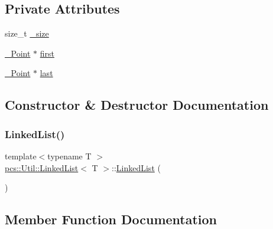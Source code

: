 \subsection*{Private Attributes}
\begin{DoxyCompactItemize}
\item 
size\+\_\+t \hyperlink{classpcs_1_1Util_1_1LinkedList_a3ce4faa5435a6f24917d9887ed8124d3}{\+\_\+size}
\item 
\hyperlink{structpcs_1_1Util_1_1LinkedList_1_1__Point}{\+\_\+\+Point} $\ast$ \hyperlink{classpcs_1_1Util_1_1LinkedList_a16b8eb9f35fc53d3a0d6c272aec4acc0}{first}
\item 
\hyperlink{structpcs_1_1Util_1_1LinkedList_1_1__Point}{\+\_\+\+Point} $\ast$ \hyperlink{classpcs_1_1Util_1_1LinkedList_a1760a747315ea22fe748f36c6016a32c}{last}
\end{DoxyCompactItemize}


\subsection{Constructor \& Destructor Documentation}
\mbox{\label{classpcs_1_1Util_1_1LinkedList_ac57e454c23a32aac315f04cd2923224a}} 
\subsubsection{\texorpdfstring{Linked\+List()}{LinkedList()}}
{\footnotesize\ttfamily template$<$typename T $>$ \\
\hyperlink{classpcs_1_1Util_1_1LinkedList}{pcs\+::\+Util\+::\+Linked\+List}$<$ T $>$\+::\hyperlink{classpcs_1_1Util_1_1LinkedList}{Linked\+List} (\begin{DoxyParamCaption}{ }\end{DoxyParamCaption})\hspace{0.3cm}{\ttfamily [inline]}}



\subsection{Member Function Documentation}
\mbox{\label{classpcs_1_1Util_1_1LinkedList_a76e86131234ae5242e02a199ae2a8645}} 
